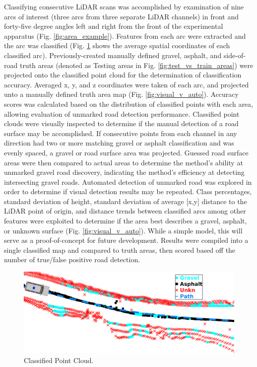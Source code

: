 \documentclass[journal,onecolumn]{IEEEtran}
\begin{document}
			
			{Classifying consecutive LiDAR scans was accomplished by examination of nine arcs of interest (three arcs from three separate LiDAR channels) in front and forty-five degree angles left and right from the front of the experimental apparatus (Fig. \ref{fig:area_example}). Features from each arc were extracted and the arc was classified (Fig. \ref{fig:raw_classification_results} shows the average spatial coordinates of each classified arc). Previously-created manually defined gravel, asphalt, and side-of-road truth areas (denoted as Testing areas in Fig. \ref{fig:test_vs_train_areas}) were projected onto the classified point cloud for the determination of classification accuracy. Averaged x, y, and z coordinates were taken of each arc, and projected unto a manually defined truth area map (Fig. \ref{fig:visual_v_auto}). Accuracy scores was calculated based on the distribution of classified points with each area, allowing evaluation of unmarked road detection performance. Classified point clouds were visually inspected to determine if the manual detection of a road surface may be accomplished. If consecutive points from each channel in any direction had two or more matching gravel or asphalt classification and was evenly spaced, a gravel or road surface area was projected. Guessed road surface areas were then compared to actual areas to determine the method's ability at unmarked gravel road discovery, indicating the method's efficiency at detecting intersecting gravel roads. Automated detection of unmarked road was explored in order to determine if visual detection results may be repeated. Class percentages, standard deviation of height, standard deviation of average [x,y] distance to the LiDAR point of origin, and distance trends between classified arcs among other features were exploited to determine if the area best describes a gravel, asphalt, or unknown surface (Fig. \ref{fig:visual_v_auto}). While a simple model, this will serve as a proof-of-concept for future development. Results were compiled into a single classified map and compared to truth areas, then scored based off the number of true/false positive road detection.  }
			
			\begin{figure}[H]
				\centering
				\includegraphics[width=0.9\linewidth]{figures/db1range.png}
				\caption[Classified Point Cloud]{Classified Point Cloud.}
				\label{fig:raw_classification_results}
			\end{figure}
		
\end{document}
